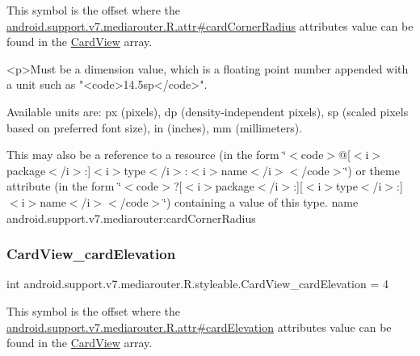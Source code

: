 This symbol is the offset where the \hyperlink{classandroid_1_1support_1_1v7_1_1mediarouter_1_1R_1_1attr_a3789fe824c1a499701cd9905dd1671de}{android.\+support.\+v7.\+mediarouter.\+R.\+attr\#card\+Corner\+Radius} attribute\textquotesingle{}s value can be found in the \hyperlink{classandroid_1_1support_1_1v7_1_1mediarouter_1_1R_1_1styleable_a58720bc744e6374c25e81b8ae15a2c6a}{Card\+View} array.

\begin{DoxyVerb}      <p>Must be a dimension value, which is a floating point number appended with a unit such as "<code>14.5sp</code>".
\end{DoxyVerb}
 Available units are\+: px (pixels), dp (density-\/independent pixels), sp (scaled pixels based on preferred font size), in (inches), mm (millimeters). 

This may also be a reference to a resource (in the form \char`\"{}$<$code$>$@\mbox{[}$<$i$>$package$<$/i$>$\+:\mbox{]}$<$i$>$type$<$/i$>$\+:$<$i$>$name$<$/i$>$$<$/code$>$\char`\"{}) or theme attribute (in the form \char`\"{}$<$code$>$?\mbox{[}$<$i$>$package$<$/i$>$\+:\mbox{]}\mbox{[}$<$i$>$type$<$/i$>$\+:\mbox{]}$<$i$>$name$<$/i$>$$<$/code$>$\char`\"{}) containing a value of this type.  name android.\+support.\+v7.\+mediarouter\+:card\+Corner\+Radius \mbox{\label{classandroid_1_1support_1_1v7_1_1mediarouter_1_1R_1_1styleable_ac95f8abaff3bbe9cdf203343d4259207}} 
\subsubsection{\texorpdfstring{Card\+View\+\_\+card\+Elevation}{CardView\_cardElevation}}
{\footnotesize\ttfamily int android.\+support.\+v7.\+mediarouter.\+R.\+styleable.\+Card\+View\+\_\+card\+Elevation = 4\hspace{0.3cm}{\ttfamily [static]}}

This symbol is the offset where the \hyperlink{classandroid_1_1support_1_1v7_1_1mediarouter_1_1R_1_1attr_a4a3eb8639f587203282b0890b75e5057}{android.\+support.\+v7.\+mediarouter.\+R.\+attr\#card\+Elevation} attribute\textquotesingle{}s value can be found in the \hyperlink{classandroid_1_1support_1_1v7_1_1mediarouter_1_1R_1_1styleable_a58720bc744e6374c25e81b8ae15a2c6a}{Card\+View} array.

